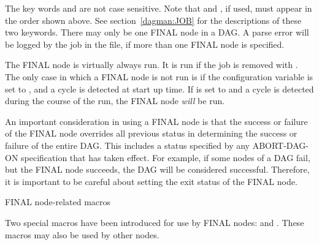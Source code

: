 The key words  and  are not case sensitive.
Note that  and , if used, must appear
in the order shown above.
See section~\ref{dagman:JOB} for the descriptions of these two keywords.
There may only be one FINAL node in a DAG.
A parse error will be logged by the  job in the
 file,
if more than one FINAL node is specified.

The FINAL node is virtually always run.
It is run if the  job is removed with .
The only case in which a FINAL node is not run
is if the configuration variable  
is set to ,
and a cycle is detected at start up time.
If  is set to  and
a cycle is detected during the course of the run, 
the FINAL node \emph{will} be run.

An important consideration in using a FINAL node is that the
success or failure of the FINAL node overrides all previous status
in determining the success or failure of the entire DAG.
This includes a status specified by any ABORT-DAG-ON specification
that has taken effect.
For example, if some nodes of a DAG fail,
but the FINAL node succeeds, the DAG will be considered successful.
Therefore, it is important
to be careful about setting the exit status of the FINAL node.

\begin{description}
\item[FINAL node-related macros]
\end{description}

Two special macros have been introduced for use by FINAL nodes:
 and .
These macros may also be used by other nodes.

